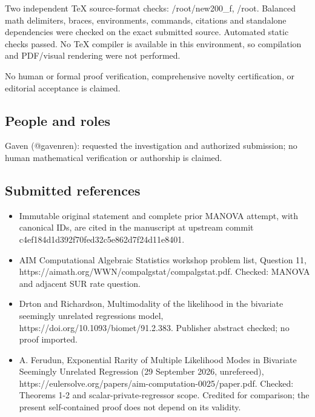 \documentclass[11pt]{article}
\begin{document}
Two independent TeX source-format checks: /root/new200\_f, /root. Balanced math delimiters, braces, environments, commands, citations and standalone dependencies were checked on the exact submitted source. Automated static checks passed. No TeX compiler is available in this environment, so compilation and PDF/visual rendering were not performed.

No human or formal proof verification, comprehensive novelty certification, or editorial acceptance is claimed.

\subsection{People and roles}

Gaven (@gavenren): requested the investigation and authorized submission; no human mathematical verification or authorship is claimed.

\subsection{Submitted references}

\begin{itemize}
\item
  Immutable original statement and complete prior MANOVA attempt, with canonical IDs, are cited in the manuscript at upstream commit c4ef184d1d392f70fed32c5e862d7f24d11e8401.
\item
  AIM Computational Algebraic Statistics workshop problem list, Question 11, https://aimath.org/WWN/compalgstat/compalgstat.pdf. Checked: MANOVA and adjacent SUR rate question.
\item
  Drton and Richardson, Multimodality of the likelihood in the bivariate seemingly unrelated regressions model, https://doi.org/10.1093/biomet/91.2.383. Publisher abstract checked; no proof imported.
\item
  A. Ferudun, Exponential Rarity of Multiple Likelihood Modes in Bivariate Seemingly Unrelated Regression (29 September 2026, unrefereed), https://eulersolve.org/papers/aim-computation-0025/paper.pdf. Checked: Theorems 1-2 and scalar-private-regressor scope. Credited for comparison; the present self-contained proof does not depend on its validity.
\end{itemize}
\end{document}
